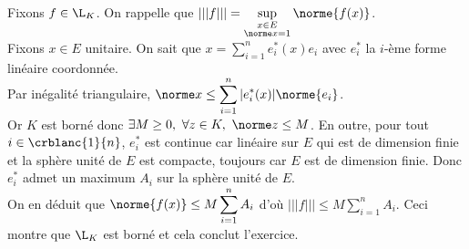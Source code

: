 \documentclass{book}
\begin{document}
	Fixons $f\in \L_K$. On rappelle que $|||f|||=\sup\limits_{\substack{x\in E\\\norme x=1}}\norme{f(x)}$.\\
	Fixons $x\in E$ unitaire. On sait que $x=\displaystyle\sum_{i=1}^ne_i^*(x)e_i$ avec $e_i^*$ la $i$-ème forme linéaire coordonnée.\\
	Par inégalité triangulaire, $\norme x\leq \displaystyle\sum_{i=1}^n|e_i^*(x)|\norme{e_i}$.\\
	Or $K$ est borné donc $\exists M\geq 0,\ \forall z\in K,\ \norme z\leq M$. En outre, pour tout $i\in \crblanc{1}{n}$, $e_i^*$ est continue car linéaire sur $E$ qui est de dimension finie et la sphère unité de $E$ est compacte, toujours car $E$ est de dimension finie. Donc $e_i^*$ admet un maximum $A_i$ sur la sphère unité de $E$.\\
	On en déduit que $\norme{f(x)}\leq M\displaystyle\sum_{i=1}^nA_i$ d'où $|||f|||\leq M\displaystyle\sum_{i=1}^nA_i$.
	Ceci montre que $\L_K$ est borné et cela conclut l'exercice.
	
\end{document}
